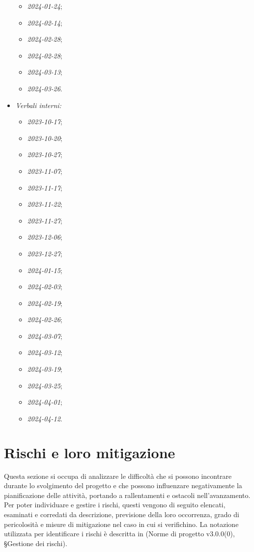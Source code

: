 \documentclass[10pt, a4paper]{article}
\begin{document}
\begin{itemize}
\begin{itemize}
        \item \textit{2024-01-24};
        \item \textit{2024-02-14};
        \item \textit{2024-02-28};
        \item \textit{2024-02-28};
        \item \textit{2024-03-13};
        \item \textit{2024-03-26}.
    \end{itemize}
    \item \textit{Verbali interni:}
    \begin{itemize}
        \item \textit{2023-10-17};
        \item \textit{2023-10-20};
        \item \textit{2023-10-27};
        \item \textit{2023-11-07};
        \item \textit{2023-11-17};
        \item \textit{2023-11-22};
        \item \textit{2023-11-27};
        \item \textit{2023-12-06};
        \item \textit{2023-12-27};
        \item \textit{2024-01-15};
        \item \textit{2024-02-03};
        \item \textit{2024-02-19};
        \item \textit{2024-02-26};
        \item \textit{2024-03-07};
        \item \textit{2024-03-12};
        \item \textit{2024-03-19};
        \item \textit{2024-03-25};
        \item \textit{2024-04-01};
        \item \textit{2024-04-12}.
    \end{itemize}
\end{itemize}

\newpage

\section{Rischi e loro mitigazione}
\label{section:Rischi}
Questa sezione si occupa di analizzare le difficoltà che si possono incontrare durante lo svolgimento del progetto e che possono influenzare negativamente la pianificazione delle attività, portando a rallentamenti e ostacoli nell'avanzamento.\\
Per poter individuare e gestire i rischi, questi vengono di seguito elencati, esaminati e corredati da descrizione, previsione della loro occorrenza, grado di pericolosità e misure di mitigazione nel caso in cui si verifichino.
La notazione utilizzata per identificare i rischi è descritta in (Norme di progetto v3.0.0(0), \S Gestione dei rischi).
\end{document}
